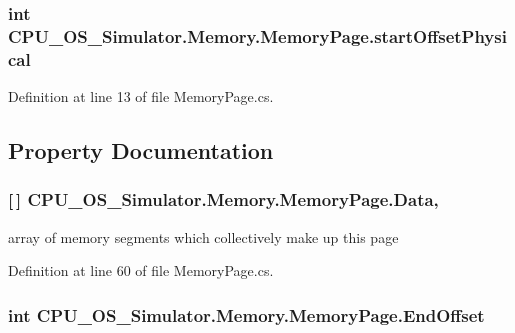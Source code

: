 \subsubsection[{start\+Offset\+Physical}]{\setlength{\rightskip}{0pt plus 5cm}int C\+P\+U\+\_\+\+O\+S\+\_\+\+Simulator.\+Memory.\+Memory\+Page.\+start\+Offset\+Physical\hspace{0.3cm}{\ttfamily [private]}}\label{class_c_p_u___o_s___simulator_1_1_memory_1_1_memory_page_a3cecfb0fe2f91def3db5711180442d44}


Definition at line 13 of file Memory\+Page.\+cs.



\subsection{Property Documentation}
\hypertarget{class_c_p_u___o_s___simulator_1_1_memory_1_1_memory_page_a8bf84e82146f9ff35ffbcc32b93a9db0}{}
\subsubsection[{Data}]{ \mbox{[}$\,$\mbox{]} C\+P\+U\+\_\+\+O\+S\+\_\+\+Simulator.\+Memory.\+Memory\+Page.\+Data\hspace{0.3cm}{\ttfamily [get]}, {\ttfamily [set]}}\label{class_c_p_u___o_s___simulator_1_1_memory_1_1_memory_page_a8bf84e82146f9ff35ffbcc32b93a9db0}


array of memory segments which collectively make up this page 



Definition at line 60 of file Memory\+Page.\+cs.

\hypertarget{class_c_p_u___o_s___simulator_1_1_memory_1_1_memory_page_abe850b4a088a820ecf598af1cd9a7deb}{}
\subsubsection[{End\+Offset}]{\setlength{\rightskip}{0pt plus 5cm}int C\+P\+U\+\_\+\+O\+S\+\_\+\+Simulator.\+Memory.\+Memory\+Page.\+End\+Offset\hspace{0.3cm}{\ttfamily [get]}}\label{class_c_p_u___o_s___simulator_1_1_memory_1_1_memory_page_abe850b4a088a820ecf598af1cd9a7deb}


